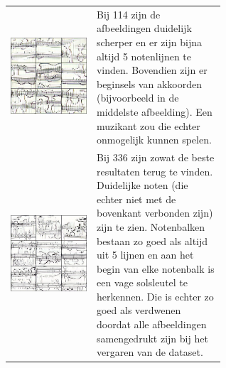 \documentclass[dutch, twoside, a4paper, 10pt]{article}
\begin{document}
\begin{table}[H]
\begin{tabular}{c p{0.6\linewidth}}
          \includegraphics[scale=0.18]{114.jpg}  & \vspace{-10\baselineskip} Bij 114 zijn de afbeeldingen duidelijk scherper en er zijn bijna altijd 5 notenlijnen te vinden. Bovendien zijn er beginsels van akkoorden (bijvoorbeeld in de middelste afbeelding). Een muzikant zou die echter onmogelijk kunnen spelen.\\
          \includegraphics[scale=0.18]{336.jpg}  & \vspace{-10\baselineskip} Bij 336 zijn zowat de beste resultaten terug te vinden. Duidelijke noten (die echter niet met de bovenkant verbonden zijn) zijn te zien. Notenbalken bestaan zo goed als altijd uit 5 lijnen en aan het begin van elke notenbalk is een vage solsleutel te herkennen. Die is echter zo goed als verdwenen doordat alle afbeeldingen samengedrukt zijn bij het vergaren van de dataset.

\end{tabular}
\end{table}
\end{document}
